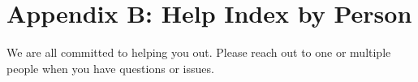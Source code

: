 \section{\texorpdfstring{{}}{}}\label{h.5oy9ibaf1dqv}

\hypertarget{h.rx44x066pd94}{\section{\texorpdfstring{{Appendix B: Help
Index by
Person}}{Appendix B: Help Index by Person}}\label{h.rx44x066pd94}}

{We are all committed to helping you out. Please reach out to one or
multiple people when you have questions or issues.}

{}

\protect\hypertarget{t.b4261ed592bb8c92910df1e0a7521284f55b4371}{}{}\protect\hypertarget{t.1}{}{}

